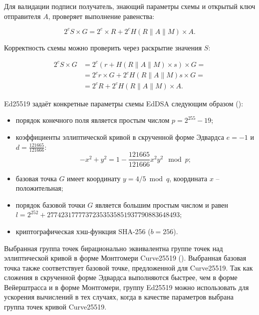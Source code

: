 Для валидации подписи получатель, знающий параметры схемы и открытый ключ отправителя $A$, проверяет выполнение равенства:

\[
	2^c S \times G = 2^c \times R + 2^c H( R \| A \| M ) \times A.
\]

Корректность схемы можно проверить через раскрытие значения $S$:

\[ \begin{array}{ll}
2^c S \times G & = 2^c ( r + H( R \| A \| M ) \times s ) \times G = \\
               & = 2^c r \times G + 2^c H( R \| A \| M ) s \times G = \\
               & = 2^c R + 2^c H( R \| A \| M ) \times A.
\end{array} \]

Ed25519 задаёт конкретные параметры схемы EdDSA следующим образом (\cite{Bernstein:Duif:Lange:Schwabe:Yang:2011}):

\begin{itemize}
	\item порядок конечного поля является простым числом $p = 2^{255}-19$;
	\item коэффициенты эллиптической кривой в скрученной форме Эдвардса $e = -1$ и $d = \frac{121665}{121666}$:
\[
-x^2 + y^2 = 1 - \frac{121665}{121666}x^2y^2 \mod p;
\]
	\item базовая точка $G$ имеет координату $y = 4/5 \bmod q$, координата $x$ -- положительная;
	\item порядок базовой точки $G$ является большим простым числом и равен $l = 2^{252} + 27742317777372353535851937790883648493$;
	\item криптографическая хэш-функция SHA-256 ($b = 256$).
\end{itemize}

Выбранная группа точек бирационально эквивалентна группе точек над эллиптической кривой в форме Монтгомери Curve25519 (\cite{Bernstein:2006}). Выбранная базовая точка также соответствует базовой точке, предложенной для Curve25519. Так как сложения в скрученной форме Эдвардса выполняются быстрее, чем в форме Вейерштрасса и в форме Монтгомери, группу Ed25519 можно использовать для ускорения вычислений в тех случаях, когда в качестве параметров выбрана группа точек кривой Curve25519.